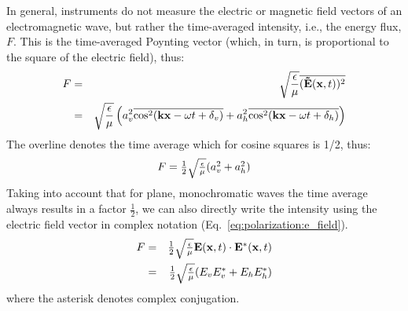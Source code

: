 In general, instruments do not measure the electric or magnetic field
vectors of an electromagnetic wave, but rather the time-averaged
intensity, i.e., the energy flux, $F$. This is the time-averaged Poynting
vector (which, in turn, is proportional to the square of the electric
field), thus:
\begin{eqnarray}
  F 
  &=& 
  \sqrt{\frac{\epsilon}{\mu}}\overline{(\mathbf{\tilde{E}}(\mathbf{x},t))^2}\\
   \nonumber
  &=&
  \sqrt{\frac{\epsilon}{\mu}}\left(
    a_v^2\overline{\cos^2(\mathbf{k}\mathbf{x} - \omega t + \delta_v)}
    + a_h^2\overline{\cos^2(\mathbf{k}\mathbf{x} - \omega t + \delta_h)}
   \right)
  \label{eq:polarization:intensity}
\end{eqnarray}
The overline denotes the time average
which for cosine squares is 1/2, thus:
\begin{equation}
  \label{eq:polarization:intensity2}
 F = 
  \textstyle\frac{1}{2}\sqrt{\frac{\epsilon}{\mu}}(
    a_v^2 + a_h^2)  
\end{equation}
Taking into account that for plane, monochromatic waves 
the time average always results in a factor
$\frac{1}{2}$, we can also directly write the intensity using the
electric field vector in complex notation
(Eq.~\ref{eq:polarization:e_field}).
\begin{eqnarray}
  \label{eq:polarization:intensity_from_complex}
  F &=&  \textstyle\frac{1}{2}\sqrt{\frac{\epsilon}{\mu}} \mathbf{E} (\mathbf{x},t) 
          \cdot \mathbf{E}^\ast (\mathbf{x},t)\\ \nonumber
    &=&   \textstyle\frac{1}{2}\sqrt{\frac{\epsilon}{\mu}}
          (E_v E_v^\ast + E_h E_h^\ast)
\end{eqnarray}
where the asterisk denotes complex conjugation.%

